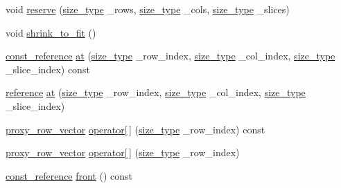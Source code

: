 \begin{DoxyCompactItemize}
\item 
void \hyperlink{classcrsc_1_1dynamic__r3__tensor_a69fafdea7746344c3769ce3fcee1ab14}{reserve} (\hyperlink{classcrsc_1_1dynamic__r3__tensor_a00e5f1f46f16d0c0ac1cffa6bd0fe862}{size\+\_\+type} \+\_\+rows, \hyperlink{classcrsc_1_1dynamic__r3__tensor_a00e5f1f46f16d0c0ac1cffa6bd0fe862}{size\+\_\+type} \+\_\+cols, \hyperlink{classcrsc_1_1dynamic__r3__tensor_a00e5f1f46f16d0c0ac1cffa6bd0fe862}{size\+\_\+type} \+\_\+slices)
\item 
void \hyperlink{classcrsc_1_1dynamic__r3__tensor_a6dc4799f28a64c673e3705b395fc5279}{shrink\+\_\+to\+\_\+fit} ()
\item 
\hyperlink{classcrsc_1_1dynamic__r3__tensor_a5dd99c21cd4dc396a2ae225f90301cdc}{const\+\_\+reference} \hyperlink{classcrsc_1_1dynamic__r3__tensor_a31cbdf0deeccebf234f1aa03f5e47dae}{at} (\hyperlink{classcrsc_1_1dynamic__r3__tensor_a00e5f1f46f16d0c0ac1cffa6bd0fe862}{size\+\_\+type} \+\_\+row\+\_\+index, \hyperlink{classcrsc_1_1dynamic__r3__tensor_a00e5f1f46f16d0c0ac1cffa6bd0fe862}{size\+\_\+type} \+\_\+col\+\_\+index, \hyperlink{classcrsc_1_1dynamic__r3__tensor_a00e5f1f46f16d0c0ac1cffa6bd0fe862}{size\+\_\+type} \+\_\+slice\+\_\+index) const 
\item 
\hyperlink{classcrsc_1_1dynamic__r3__tensor_a1a4d3cf01c93ee5b24b927236b1fd4b1}{reference} \hyperlink{classcrsc_1_1dynamic__r3__tensor_a8a18ab865c68d8632c2185cfcb5dbe25}{at} (\hyperlink{classcrsc_1_1dynamic__r3__tensor_a00e5f1f46f16d0c0ac1cffa6bd0fe862}{size\+\_\+type} \+\_\+row\+\_\+index, \hyperlink{classcrsc_1_1dynamic__r3__tensor_a00e5f1f46f16d0c0ac1cffa6bd0fe862}{size\+\_\+type} \+\_\+col\+\_\+index, \hyperlink{classcrsc_1_1dynamic__r3__tensor_a00e5f1f46f16d0c0ac1cffa6bd0fe862}{size\+\_\+type} \+\_\+slice\+\_\+index)
\item 
\hyperlink{classcrsc_1_1dynamic__r3__tensor_1_1proxy__row__vector}{proxy\+\_\+row\+\_\+vector} \hyperlink{classcrsc_1_1dynamic__r3__tensor_aaa966e0bcf43c65545a4dd545c1523aa}{operator\mbox{[}$\,$\mbox{]}} (\hyperlink{classcrsc_1_1dynamic__r3__tensor_a00e5f1f46f16d0c0ac1cffa6bd0fe862}{size\+\_\+type} \+\_\+row\+\_\+index) const 
\item 
\hyperlink{classcrsc_1_1dynamic__r3__tensor_1_1proxy__row__vector}{proxy\+\_\+row\+\_\+vector} \hyperlink{classcrsc_1_1dynamic__r3__tensor_a68aa3cc4cd42d04fdb15e781b010893b}{operator\mbox{[}$\,$\mbox{]}} (\hyperlink{classcrsc_1_1dynamic__r3__tensor_a00e5f1f46f16d0c0ac1cffa6bd0fe862}{size\+\_\+type} \+\_\+row\+\_\+index)
\item 
\hyperlink{classcrsc_1_1dynamic__r3__tensor_a5dd99c21cd4dc396a2ae225f90301cdc}{const\+\_\+reference} \hyperlink{classcrsc_1_1dynamic__r3__tensor_aae6b6449ab6dc97091e5d8a87496111b}{front} () const 

\end{DoxyCompactItemize}
